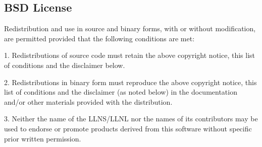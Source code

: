 \subsection{BSD License}
Redistribution and use in source and binary forms, with or without
modification, are permitted provided that the following conditions
are met:
 
1. Redistributions of source code must retain the above copyright
notice, this list of conditions and the disclaimer below.
 
2. Redistributions in binary form must reproduce the above copyright
notice, this list of conditions and the disclaimer (as noted below)
in the documentation and/or other materials provided with the
distribution.
 
3. Neither the name of the LLNS/LLNL nor the names of its contributors
may be used to endorse or promote products derived from this software
without specific prior written permission.
\\

